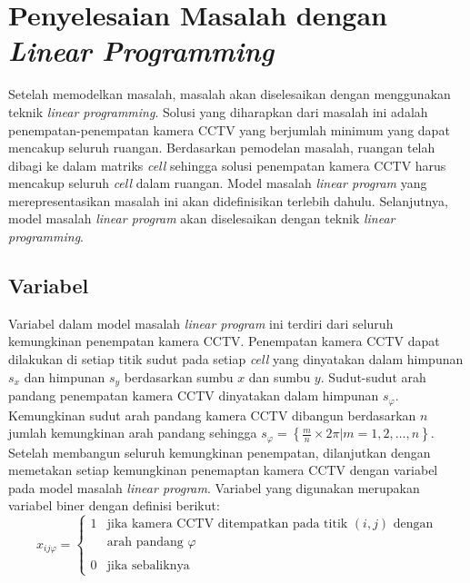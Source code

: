 \section{Penyelesaian Masalah dengan \textit{Linear Programming}}
Setelah memodelkan masalah, masalah akan diselesaikan dengan menggunakan teknik \textit{linear programming}. Solusi yang diharapkan dari masalah ini adalah penempatan-penempatan kamera CCTV yang berjumlah minimum yang dapat mencakup seluruh ruangan. Berdasarkan pemodelan masalah, ruangan telah dibagi ke dalam matriks \textit{cell} sehingga solusi penempatan kamera CCTV harus mencakup seluruh \textit{cell} dalam ruangan. Model masalah \textit{linear program} yang merepresentasikan masalah ini akan didefinisikan terlebih dahulu. Selanjutnya, model masalah \textit{linear program} akan diselesaikan dengan teknik \textit{linear programming}.


\subsection{Variabel}
Variabel dalam model masalah \textit{linear program} ini terdiri dari seluruh kemungkinan penempatan kamera CCTV. Penempatan kamera CCTV dapat dilakukan di setiap titik sudut pada setiap \textit{cell} yang dinyatakan dalam himpunan \(s_x\) dan himpunan \(s_y\) berdasarkan sumbu \(x\) dan sumbu \(y\). Sudut-sudut arah pandang penempatan kamera CCTV dinyatakan dalam himpunan \(s_\varphi\). Kemungkinan sudut arah pandang kamera CCTV dibangun berdasarkan \(n\) jumlah kemungkinan arah pandang sehingga \(s_\varphi = \left\{\frac{m}{n} \times 2\pi \lvert m = 1,2,\dots,n \right\}\). Setelah membangun seluruh kemungkinan penempatan, dilanjutkan dengan memetakan setiap kemungkinan penemaptan kamera CCTV dengan variabel pada model masalah \textit{linear program}. Variabel yang digunakan merupakan variabel biner dengan definisi berikut:
\begin{equation}
	x_{ij\varphi} =
	\left \{
		\begin{array}{ll}
			1 & \text{jika kamera CCTV ditempatkan pada titik }  (i,j)\text{ dengan}\\
			& \text{arah pandang } \varphi\\\\
			0 & \text{jika sebaliknya}
		\end{array}
	\right.
\end{equation}

